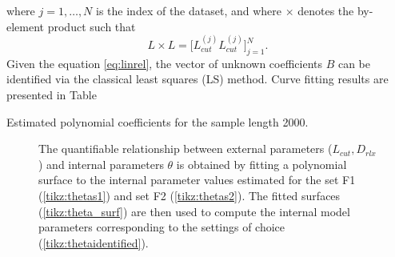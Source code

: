 \documentclass[a4paper,11pt,twoside]{article}
\theoremstyle{mytheoremstyle}
\begin{document}
where $j = 1, \dots, N$ is the index of the dataset, and where $\times$ denotes the by-element product such that
\begin{equation*}
L\times L = \Big[ L_{cut}^{(j)} L_{cut}^{(j)}\Big]^{N}_{j=1}.
\end{equation*}
Given the equation \eqref{eq:linrel}, the vector of unknown coefficients $B$ can be identified via the classical least squares (LS) method.
Curve fitting results are presented in Table
\begin{table}[!h]
	\centering
	\caption{Estimated polynomial coefficients for the sample length 2000.}
	\small
	
\end{table}

\begin{figure}[!h]
	\centering
	
	\caption{The quantifiable relationship between external parameters ($L_{cut}, D_{rlx}$) and internal parameters $\theta$ is obtained by fitting a polynomial surface to  the internal parameter values estimated for the set F1 (\ref{tikz:thetas1}) and set F2 (\ref{tikz:thetas2}). The fitted surfaces (\ref{tikz:theta_surf}) are then used to compute the internal model parameters corresponding to the settings of choice (\ref{tikz:thetaidentified}). }
\end{figure}
\end{document}
